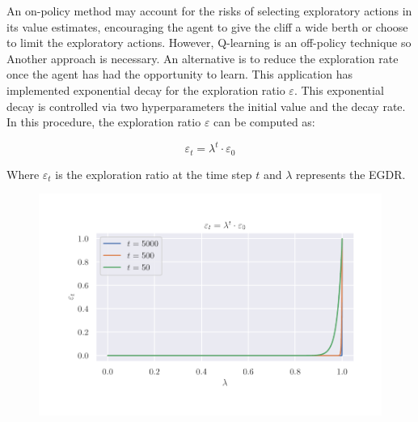 \documentclass[]{final_report}
\begin{document}
An on-policy method may account for the risks of selecting exploratory actions in its value estimates, encouraging the agent to give the cliff a wide berth or choose to limit the exploratory actions. However, Q-learning is an off-policy technique so Another approach is necessary. An alternative is to reduce the exploration rate once the agent has had the opportunity to learn. This application has implemented exponential decay for the exploration ratio $\varepsilon$. This exponential decay is controlled via two hyperparameters the initial value and the decay rate. In this procedure, the exploration ratio $\varepsilon$ can be computed as: 

\begin{equation}
  \varepsilon_t = \lambda^t \cdot \varepsilon_0
\end{equation}

Where $\varepsilon_t$ is the exploration ratio at the time step $t$ and $\lambda$ represents the EGDR.

  
  

\begin{figure}[H]
  \centering
  
  \includegraphics[trim={0 1cm 0 1cm},clip, width=\textwidth]{hyper-paramiters/example-curve.pdf}
  
  \caption{\label{fig:example-curve}}
\end{figure}
\end{document}
